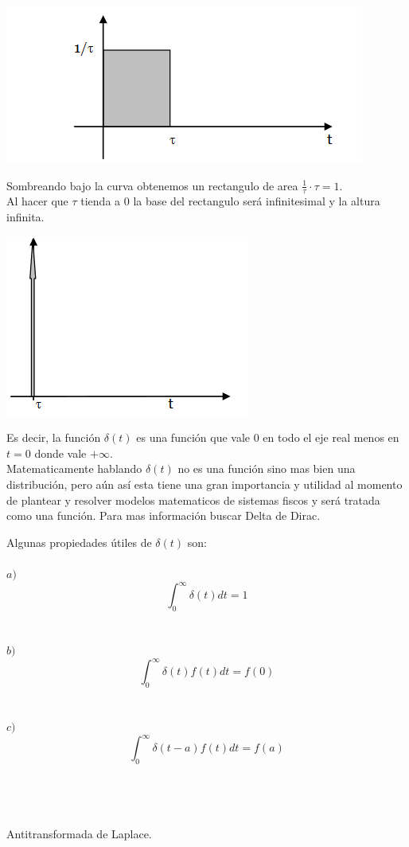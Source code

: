 \documentclass[]{article}
\begin{document}
	\includegraphics{../../../Imagenes/Superior/Superior06.PNG}
	
	Sombreando bajo la curva obtenemos un rectangulo de area $\frac{1}{\tau} \cdot \tau = 1$.\\
	Al hacer que $\tau$ tienda a $0$ la base del rectangulo será infinitesimal y la altura infinita.
	
	\includegraphics{../../../Imagenes/Superior/Superior07.PNG}

Es decir, la función $\delta(t)$ es una función que vale $0$ en todo el eje real menos en $t = 0$ donde vale $+\infty$.\\
Matematicamente hablando $\delta(t)$ no es una función sino mas bien una distribución, pero aún así esta tiene una gran importancia y utilidad al momento de plantear y resolver modelos matematicos de sistemas fiscos y será tratada como una función. Para mas información buscar Delta de Dirac.

Algunas propiedades útiles de $\delta(t)$ son:
\\
\\
$a)$
$$
\int_{0}^{\infty} \delta(t) dt = 1
$$
\\
\\
$b)$
$$
\int_{0}^{\infty} \delta(t)f(t) dt = f(0)
$$
\\
\\
$c)$
$$
\int_{0}^{\infty} \delta(t-a)f(t) dt = f(a)
$$
\\
\\
\\
\\
\huge Antitransformada de Laplace.


	
\end{document}
